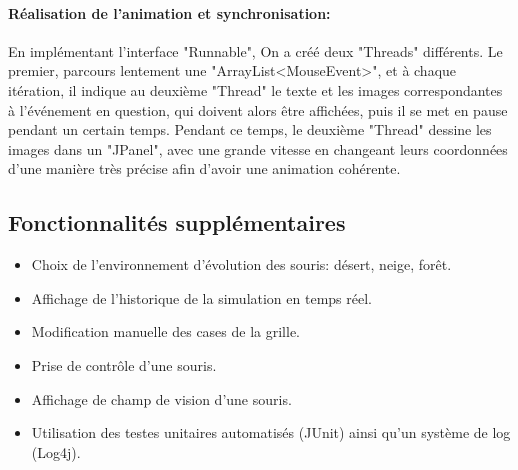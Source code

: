 \paragraph{Réalisation de l'animation et synchronisation:}En implémentant l'interface "Runnable", On a créé deux "Threads" différents. Le premier, parcours lentement une "ArrayList<MouseEvent>", et à chaque itération, il indique au deuxième "Thread" le texte et les images correspondantes à l'événement en question, qui doivent alors être affichées, puis il se met en pause pendant un certain temps. Pendant ce temps, le deuxième "Thread" dessine les images dans un "JPanel", avec une grande vitesse en changeant leurs coordonnées d'une manière très précise afin d'avoir une animation cohérente.

\subsection{Fonctionnalités supplémentaires}
\begin{itemize}
\item Choix de l'environnement d'évolution des souris: désert, neige, forêt.
\item Affichage de l'historique de la simulation en temps réel.
\item Modification manuelle des cases de la grille.
\item Prise de contrôle d'une souris.
\item Affichage de champ de vision  d'une souris.
\item Utilisation des testes unitaires automatisés (JUnit) ainsi qu'un système de log (Log4j).
\end{itemize}